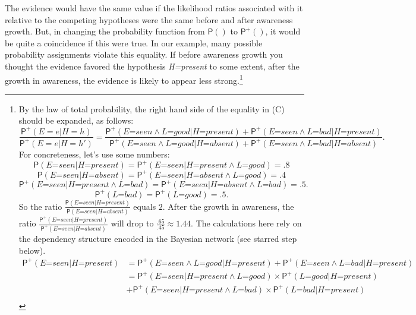 \documentclass[
  11pt,
  dvipsnames,enabledeprecatedfontcommands]{scrartcl}
\newcommand{\pr}[1]{\ensuremath{\mathsf{P}(#1)}}
\newcommand{\ppr}[2]{\ensuremath{\mathsf{P}^{#1}(#2)}}
\begin{document}
The evidence would have the same value if the likelihood ratios
associated with it relative to the competing hypotheses were the same
before and after awareness growth. But, in changing the probability
function from \(\pr{}\) to \(\ppr{+}{}\), it would be quite a
coincidence if this were true. In our example, many possible probability
assignments violate this equality. If before awareness growth you
thought the evidence favored the hypothesis \textit{H=present} to some
extent, after the growth in awareness, the evidence is likely to appear
less strong.\footnote{By the law of total probability, the right hand
  side of the equality in (C) should be expanded, as follows:
  \[\frac{\ppr{+}{E=e \vert H=h}}{\ppr{+}{E=e \vert H=h'}}=\frac{\ppr{+}{\textit{E=seen} \wedge \textit{L=good} \vert \textit{H=present}}+\ppr{+}{\textit{E=seen} \wedge \textit{L=bad} \vert \textit{H=present}}}{\ppr{+}{\textit{E=seen} \wedge \textit{L=good} \vert \textit{H=absent}}+\ppr{+}{\textit{E=seen} \wedge \textit{L=bad} \vert \textit{H=absent}}}.\]
  For concreteness, let's use some numbers:
  \[\pr{\textit{E=seen} \vert \textit{H=present}}=\ppr{+}{\textit{E=seen} \vert \textit{H=present} \wedge \textit{L=good}}=.8\]
  \[\pr{\textit{E=seen} \vert \textit{H=absent}}=\ppr{+}{\textit{E=seen} \vert \textit{H=absent} \wedge \textit{L=good}}=.4\]
  \[\ppr{+}{\textit{E=seen} \vert \textit{H=present} \wedge \textit{L=bad}} = \ppr{+}{\textit{E=seen} \vert \textit{H=absent} \wedge \textit{L=bad}}=.5.\]
  \[\ppr{+}{\textit{L=bad}} = \ppr{+}{\textit{L=good}}=.5.\] So the
  ratio
  \(\frac{\pr{\textit{E=seen} \vert \textit{H=present}}}{\pr{\textit{E=seen} \vert \textit{H=absent}}}\)
  equals \(2\). After the growth in awareness, the ratio
  \(\frac{\ppr{+}{\textit{E=seen} \vert \textit{H=present}}}{\ppr{+}{\textit{E=seen} \vert \textit{H=absent}}}\)
  will drop to \(\frac{.65}{.45}\approx 1.44\). The calculations here
  rely on the dependency structure encoded in the Bayesian network (see
  starred step below). \begin{align*}
  \ppr{+}{\textit{E=seen} \vert \textit{H=present}} &= \ppr{+}{\textit{E=seen} \wedge \textit{L=good} \vert \textit{H=present}}+\ppr{+}{\textit{E=seen} \wedge \textit{L=bad} \vert \textit{H=present}}\\
  &= \ppr{+}{\textit{E=seen} \vert \textit{H=present} \wedge \textit{L=good}}  \times \ppr{+}{\textit{L=good} \vert  \textit{H=present} }\\ & +\ppr{+}{\textit{E=seen}  \vert \textit{H=present} \wedge \textit{L=bad}} \times \ppr{+}{\textit{L=bad} \vert  \textit{H=present}}\\

\end{align*}}
\end{document}
